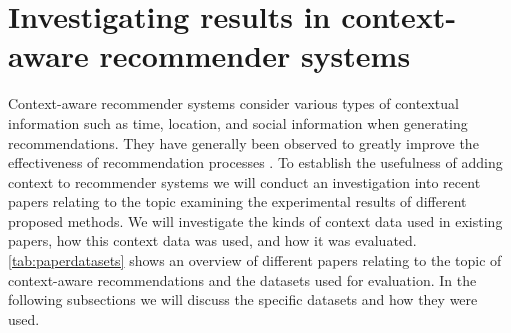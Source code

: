 \section{Investigating results in context-aware recommender systems}
Context-aware recommender systems consider various types of contextual information such as time, location, and social information when generating recommendations.
They have generally been observed to greatly improve the effectiveness of recommendation processes \cite{aggarwal2016recommender}.
To establish the usefulness of adding context to recommender systems we will conduct an investigation into recent papers relating to the topic examining the experimental results of different proposed methods.
We will investigate the kinds of context data used in existing papers, how this context data was used, and how it was evaluated.
\autoref{tab:paperdatasets} shows an overview of different papers relating to the topic of context-aware recommendations and the datasets used for evaluation.
In the following subsections we will discuss the specific datasets and how they were used.

